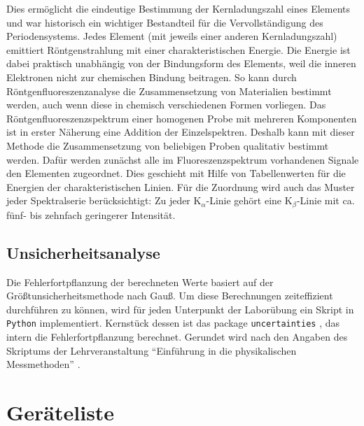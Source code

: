 \documentclass[ngerman]{scrartcl}
\begin{document}
Dies ermöglicht die eindeutige
Bestimmung der Kernladungszahl eines Elements und war historisch ein wichtiger Bestandteil für die
Vervollständigung des Periodensystems. Jedes Element (mit jeweils einer anderen Kernladungszahl)
emittiert Röntgenstrahlung mit einer charakteristischen Energie. Die Energie ist dabei praktisch
unabhängig von der Bindungsform des Elements, weil die inneren Elektronen nicht zur
chemischen Bindung beitragen. So kann durch Röntgenfluoreszenzanalyse die Zusammensetzung von
Materialien bestimmt werden, auch wenn diese in chemisch verschiedenen Formen vorliegen. Das
Röntgenfluoreszenzspektrum einer homogenen Probe mit mehreren Komponenten ist in erster
Näherung eine Addition der Einzelspektren. Deshalb kann mit dieser Methode die Zusammensetzung
von beliebigen Proben qualitativ bestimmt werden. Dafür werden zunächst alle im
Fluoreszenzspektrum vorhandenen Signale den Elementen zugeordnet. Dies geschieht mit Hilfe von
Tabellenwerten für die Energien der charakteristischen Linien. Für die Zuordnung wird auch das
Muster jeder Spektralserie berücksichtigt: Zu jeder K$_\alpha$-Linie gehört eine K$_\beta$-Linie mit ca. fünf- bis zehnfach
geringerer Intensität.


\subsection{Unsicherheitsanalyse}
\label{subsec:unsicherheitsanalyse}

Die Fehlerfortpflanzung der berechneten Werte basiert auf der Größtunsicherheitsmethode nach Gauß. Um diese Berechnungen zeiteffizient durchführen zu können, wird für jeden Unterpunkt der Laborübung ein Skript in \verb!Python! implementiert. Kernstück dessen ist das package \verb!uncertainties! \cite{ref:uncertainties}, das intern die Fehlerfortpflanzung berechnet. Gerundet wird nach den Angaben des Skriptums der Lehrveranstaltung \enquote{Einführung in die physikalischen Messmethoden} \cite{ref:messmethoden}.



\section{Geräteliste}
\label{sec:geraeteliste}
\end{document}
